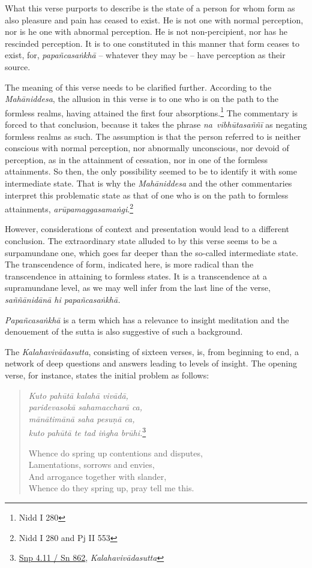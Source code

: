 What this verse purports to describe is the state of a person for whom form as also pleasure and pain has ceased to exist. He is not one with normal perception, nor is he one with abnormal perception. He is not non-percipient, nor has he rescinded perception. It is to one constituted in this manner that form ceases to exist, for, \emph{papañcasaṅkhā} -- whatever they may be -- have perception as their source.

The meaning of this verse needs to be clarified further. According to the \emph{Mahāniddesa}, the allusion in this verse is to one who is on the path to the formless realms, having attained the first four absorptions.\footnote{Nidd I 280} The commentary is forced to that conclusion, because it takes the phrase \emph{na~vibhūtasaññī} as negating formless realms as such. The assumption is that the person referred to is neither conscious with normal perception, nor abnormally unconscious, nor devoid of perception, as in the attainment of cessation, nor in one of the formless attainments. So then, the only possibility seemed to be to identify it with some intermediate state. That is why the \emph{Mahāniddesa} and the other commentaries interpret this problematic state as that of one who is on the path to formless attainments, \emph{arūpamaggasamaṅgi}.\footnote{Nidd I 280 and Pj II 553}

However, considerations of context and presentation would lead to a different conclusion. The extraordinary state alluded to by this verse seems to be a surpamundane one, which goes far deeper than the so-called intermediate state. The transcendence of form, indicated here, is more radical than the transcendence in attaining to formless states. It is a transcendence at a supramundane level, as we may well infer from the last line of the verse, \emph{saññānidānā hi papañcasaṅkhā.}

\emph{Papañcasaṅkhā} is a term which has a relevance to insight meditation and the denouement of the sutta is also suggestive of such a background.

The \emph{Kalahavivādasutta}, consisting of sixteen verses, is, from beginning to end, a network of deep questions and answers leading to levels of insight. The opening verse, for instance, states the initial problem as follows:

\begin{quote}
\emph{Kuto pahūtā kalahā vivādā,}\\
\emph{paridevasokā sahamaccharā ca,}\\
\emph{mānātimānā saha pesuṇā ca,}\\
\emph{kuto pahūtā te tad iṅgha brūhi.}\footnote{\href{https://suttacentral.net/snp4.11/pli/ms}{Snp 4.11 / Sn 862}, \emph{Kalahavivādasutta}}

Whence do spring up contentions and disputes,\\
Lamentations, sorrows and envies,\\
And arrogance together with slander,\\
Whence do they spring up, pray tell me this.
\end{quote}

